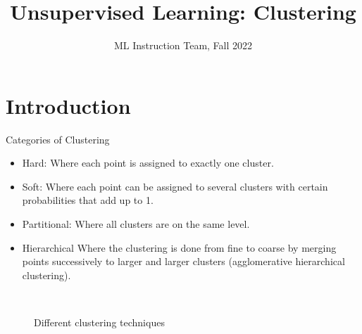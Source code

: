 \documentclass[compress,oilve]{beamer}
\title{Unsupervised Learning: Clustering}
\author{ML Instruction Team, Fall 2022}
\institute[]{CE Department \newline  Sharif University of Technology \newline \newline}
\date[\today]{}
\newcommand{\tc}[2]{
	\textcolor{#1}{#2}
}
\begin{document}
	
	\fontsize{9}{9}
\begin{frame}
	\titlepage
\end{frame}

\section{Introduction}

\begin{frame}{Categories of Clustering}
	\begin{itemize}
		\item \tc{keywords}{Hard:}Where each point is assigned to
		exactly one cluster.
		
		\medskip
		\item \tc{keywords}{Soft:}Where each point can be assigned to several clusters with certain probabilities that add up to 1.
		
		\medskip
		\item \tc{keywords}{Partitional:}Where all clusters are on the same level.
		
		\medskip
		\item \tc{keywords}{Hierarchical}Where the clustering is done from fine to coarse by merging points successively to larger and larger clusters (agglomerative hierarchical clustering).
		
	\end{itemize}

		\begin{figure}[htbp!]
		\qquad
		\\
		
		\tiny
		\caption{Different clustering techniques}
		\label{fig:globalfigure2}
		
	\end{figure}
	

\end{frame}
\end{document}
